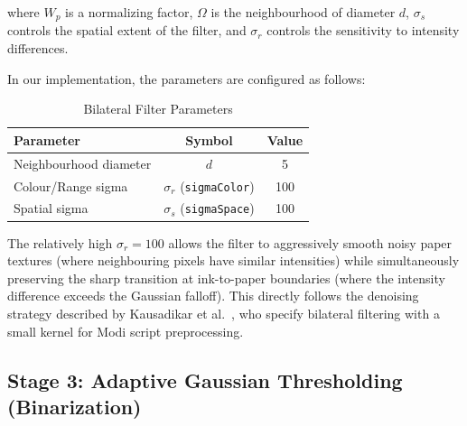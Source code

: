 \documentclass[12pt, a4paper]{article}
\begin{document}
where $W_p$ is a normalizing factor, $\Omega$ is the neighbourhood of diameter $d$, $\sigma_s$ controls the spatial extent of the filter, and $\sigma_r$ controls the sensitivity to intensity differences.

In our implementation, the parameters are configured as follows:

\begin{table}[H]
\centering
\caption{Bilateral Filter Parameters}
\label{tab:bilateral_params}
\begin{tabular}{@{}lcc@{}}
\toprule
\textbf{Parameter} & \textbf{Symbol} & \textbf{Value} \\
\midrule
Neighbourhood diameter & $d$ & 5 \\
Colour/Range sigma & $\sigma_r$ (\texttt{sigmaColor}) & 100 \\
Spatial sigma & $\sigma_s$ (\texttt{sigmaSpace}) & 100 \\
\bottomrule
\end{tabular}
\end{table}

The relatively high $\sigma_r = 100$ allows the filter to aggressively smooth noisy paper textures (where neighbouring pixels have similar intensities) while simultaneously preserving the sharp transition at ink-to-paper boundaries (where the intensity difference exceeds the Gaussian falloff). This directly follows the denoising strategy described by Kausadikar et al.~\cite{kausadikar2025}, who specify bilateral filtering with a small kernel for Modi script preprocessing.

\vspace{0.3em}
\noindent{}


\subsection{Stage 3: Adaptive Gaussian Thresholding (Binarization)}
\end{document}
